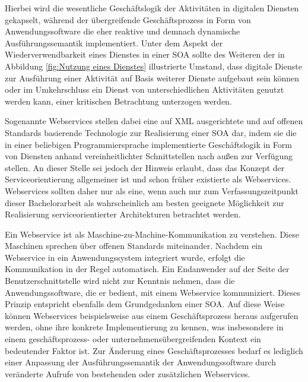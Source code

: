 Hierbei wird die wesentliche Geschäftslogik der Aktivitäten in digitalen Diensten gekapselt, während der übergreifende Geschäftsprozess in Form von Anwendungssoftware die eher reaktive und demnach dynamische Ausführungssemantik implementiert. 
\cite{Teusch.2016}
Unter dem Aspekt der Wiederverwendbarkeit eines Dienstes in einer \ac{SOA} sollte des Weiteren der in Abbildung \ref{fig:Nutzung eines Dienstes} illustrierte Umstand, dass digitale Dienste zur Ausführung einer Aktivität auf Basis weiterer Dienste aufgebaut sein können oder im Umkehrschluss ein Dienst von unterschiedlichen Aktivitäten genutzt werden kann, einer kritischen Betrachtung unterzogen werden.
\cite{Masak.2007}

Sogenannte Webservices stellen dabei eine auf \ac{XML} ausgerichtete und auf offenen Standards basierende Technologie zur Realisierung einer \ac{SOA} dar, indem sie die in einer beliebigen Programmiersprache implementierte Geschäftslogik in Form von Diensten anhand vereinheitlichter Schnittstellen nach außen zur Verfügung stellen.
\cite{Masak.2005}
An dieser Stelle sei jedoch der Hinweis erlaubt, dass das Konzept der Serviceorientierung allgemeiner ist und schon früher existierte als Webservices. Webservices sollten daher nur als eine, wenn auch nur zum Verfassungszeitpunkt dieser Bachelorarbeit als wahrscheinlich am besten geeignete Möglichkeit zur Realisierung serviceorientierter Architekturen betrachtet werden.

Ein Webservice ist als Maschine-zu-Machine-Kommunikation zu verstehen. Diese Maschinen sprechen über offenen Standards miteinander. 
\cite{Finger.2009b}
Nachdem ein Webservice in ein Anwendungssystem integriert wurde, erfolgt die Kommunikation in der Regel automatisch. 
Ein Endanwender auf der Seite der Benutzerschnittstelle wird nicht zur Kenntnis nehmen, dass die Anwendungssoftware, die er bedient, mit einem Webservice kommuniziert. Dieses Prinzip entspricht ebenfalls dem Grundgedanken einer \ac{SOA}.
\cite{Teusch.2016}
Auf diese Weise können Webservices beispielsweise aus einem Geschäftsprozess heraus aufgerufen werden, ohne ihre konkrete Implementierung zu kennen, was insbesondere in einem geschäftsprozess- oder unternehmensübergreifenden Kontext ein bedeutender Faktor ist. Zur Änderung eines Geschäftsprozesses bedarf es lediglich einer Anpassung der Ausführungssemantik der Anwendungssoftware durch veränderte Aufrufe von bestehenden oder zusätzlichen Webservices.


